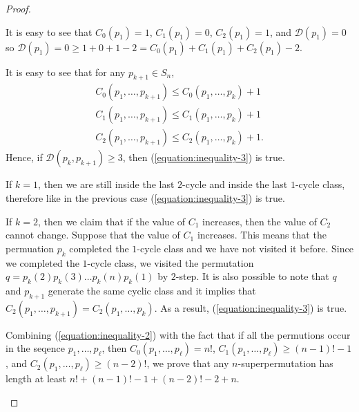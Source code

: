 \begin{proof}
\begin{itemize}
      It is easy to see that $C_0(p_1) = 1$, $C_1(p_1) = 0$, $C_2(p_1) = 1$, and
      $\mathcal{D}(p_1) = 0$ so
      $\mathcal{D}(p_1) = 0 \ge 1 + 0 + 1 - 2 =
      C_0(p_1) + C_1(p_1) + C_2(p_1)- 2$.

      It is easy to see that for any $p_{k + 1} \in S_n$,
      \begin{gather*}
        C_0(p_1, \dots, p_{k + 1}) \le C_0(p_1, \dots, p_k) + 1  \\
        C_1(p_1, \dots, p_{k + 1}) \le C_1(p_1, \dots, p_k) + 1 \\
        C_2(p_1, \dots, p_{k + 1}) \le C_2(p_1, \dots, p_k) + 1.
      \end{gather*}
      Hence, if $\mathcal{D}(p_k, p_{k + 1}) \ge 3$, then
      (\ref{equation:inequality-3}) is true.

      If $k = 1$, then we are still
      inside the last $2$-cycle and inside the last $1$-cycle class, therefore
      like in the previous case (\ref{equation:inequality-3}) is true.

      If $k = 2$, then we claim that if the value of $C_1$ increases, then
      the value of $C_2$ cannot change. Suppose that the value of $C_1$
      increases. This means that the permuation $p_k$ completed the $1$-cycle
      class and we have not visited it before. Since we
      completed the $1$-cycle class, we visited the permutation
      $q = p_k(2) p_k(3) \dots p_k(n) p_k(1)$ by $2$-step.
      It is also possible to note that $q$ and
      $p_{k + 1}$ generate the same cyclic class and it
      implies that $C_2(p_1, \dots, p_{k + 1}) = C_2(p_1, \dots, p_k)$.
      As a result, (\ref{equation:inequality-3}) is true.

      Combining (\ref{equation:inequality-2}) with the
      fact that if all the
      permutions occur in the seqence $p_1, \dots, p_\ell$, then
      $C_0(p_1, \dots, p_\ell) = n!$, $C_1(p_1, \dots, p_\ell) \ge
      (n - 1)! - 1$, and $C_2(p_1, \dots, p_\ell) \ge (n - 2)!$,
      we prove that any $n$-superpermutation has length at least
      $n! + (n - 1)! - 1 + (n - 2)! - 2 + n$.
  \end{itemize}
\end{proof}

